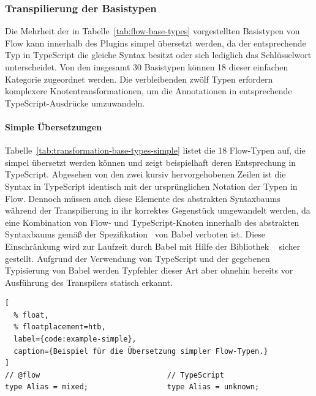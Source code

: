 \subsubsection{Transpilierung der Basistypen}

Die Mehrheit der in Tabelle~\ref{tab:flow-base-types} vorgestellten Basistypen von Flow kann innerhalb des Plugins simpel übersetzt werden, da der entsprechende Typ in TypeScript die gleiche Syntax besitzt oder sich lediglich das Schlüsselwort unterscheidet. Von den insgesamt 30 Basistypen können 18 dieser einfachen Kategorie zugeordnet werden. Die verbleibenden zwölf Typen erfordern komplexere Knotentransformationen, um die Annotationen in entsprechende TypeScript-Ausdrücke umzuwandeln.

\vspace{-0.5\baselineskip}
\paragraph{Simple Übersetzungen}

Tabelle~\ref{tab:transformation-base-types-simple} listet die 18 Flow-Typen auf, die simpel übersetzt werden können und zeigt beispielhaft deren Entsprechung in TypeScript. Abgesehen von den zwei kursiv hervorgehobenen Zeilen ist die Syntax in TypeScript identisch mit der ursprünglichen Notation der Typen in Flow. Dennoch müssen auch diese Elemente des abstrakten Syntaxbaums während der Transpilierung in ihr korrektes Gegenstück umgewandelt werden, da eine Kombination von Flow- und TypeScript-Knoten innerhalb des abstrakten Syntaxbaums gemäß der Spezifikation~\autocite{BABEL:PARSER_SPEC} von Babel verboten ist. Diese Einschränkung wird zur Laufzeit durch Babel mit Hilfe der Bibliothek ~\autocite{BABEL:TYPES} sicher gestellt. Aufgrund der Verwendung von TypeScript und der gegebenen Typisierung von Babel werden Typfehler dieser Art aber ohnehin bereits vor Ausführung des Transpilers statisch erkannt.

\tablespace


\begin{lstlisting}[
  % float,
  % floatplacement=htb,
  label={code:example-simple},
  caption={Beispiel für die Übersetzung simpler Flow-Typen.}
]
// @flow                             // TypeScript
type Alias = mixed;                  type Alias = unknown;
\end{lstlisting}

